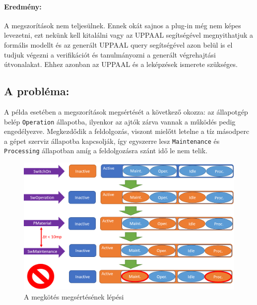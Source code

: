 \paragraph{Eredmény:} A megszorítások nem teljesülnek. Ennek okát sajnos a plug-in még nem képes levezetni, ezt nekünk kell kitalálni vagy az UPPAAL segítségével megnyithatjuk a formális modellt és az generált UPPAAL query segítségével azon belül is el tudjuk végezni a verifikációt és tanulmányozni a generált végrehajtási útvonalakat. Ehhez azonban az UPPAAL és a leképzések ismerete szükséges.
\subsection{A probléma:} A példa esetében a megszorítások megsértését a következő okozza: az állapotgép belép \verb+Operation+ állapotba, ilyenkor az ajtók zárva vannak a működés pedig engedélyezve. Megkezdődik a feldolgozás, viszont mielőtt letelne a tíz másodperc a gépet szerviz állapotba kapcsolják, így egyszerre lesz \verb+Maintenance+ és \verb+Processing+ állapotban amíg a feldolgozásra szánt idő le nem telik.

\begin{figure}[H]
	\includegraphics[keepaspectratio, width=150mm]{figures/trace.png}
	\caption{A megkötés megsértésének lépési}
\end{figure}

